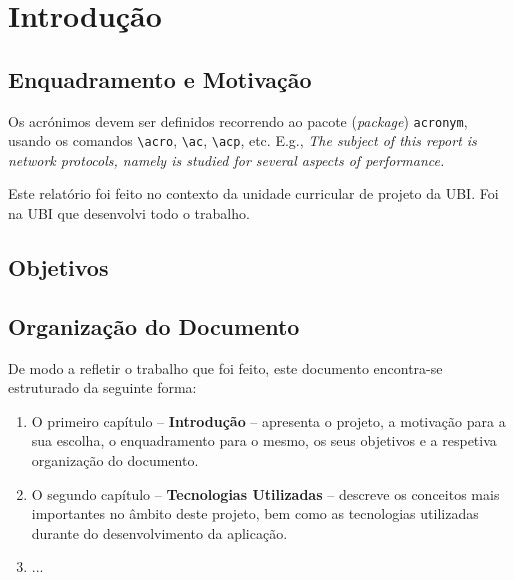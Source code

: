 \chapter{Introdução}
\label{chap:intro}

\section{Enquadramento e Motivação}
\label{sec:amb} %

Os acrónimos devem ser definidos recorrendo ao pacote (\emph{package}) \texttt{acronym}, usando os comandos \texttt{\textbackslash acro}, \texttt{\textbackslash ac}, \texttt{\textbackslash acp}, etc. E.g., \emph{The subject of this report is network protocols, namely is studied for several aspects of performance.}

Este relatório foi feito no contexto da unidade curricular de projeto da \ac{UBI}. Foi na \ac{UBI} que desenvolvi todo o trabalho.
                                                                        
\section{Objetivos}
\label{sec:obj}

\section{Organização do Documento}
\label{sec:organ}
De modo a refletir o trabalho que foi feito, este documento encontra-se estruturado da seguinte forma:
\begin{enumerate}
\item O primeiro capítulo -- \textbf{Introdução} -- apresenta o projeto, a motivação para a sua escolha, o enquadramento para o mesmo, os seus objetivos e a respetiva organização do documento.
\item O segundo capítulo -- \textbf{Tecnologias Utilizadas} -- descreve os conceitos mais importantes no âmbito deste projeto, bem como as tecnologias utilizadas durante do desenvolvimento da aplicação.
\item ...
\end{enumerate}

% 
